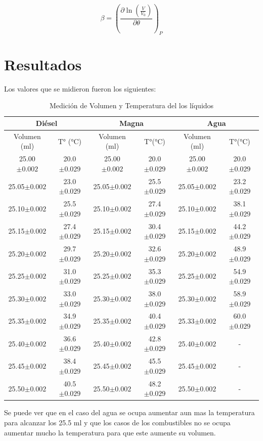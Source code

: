 \documentclass[12pt]{article}
\begin{document}
\begin{equation}
\beta = \left( \frac{\partial \ln \left(\frac{V}{V_0} \right)  }{\partial \theta} \right) _{P}
\end{equation}


\section{Resultados}
Los valores que se midieron fueron los siguientes:

\begin{table}[H]
\centering
\begin{tabular}{|c|c||c|c||c|c|}
\hline
\multicolumn{2}{|c||}{Diésel}  & \multicolumn{2}{|c||}{Magna}  & \multicolumn{2}{|c|}{Agua} \\ \hline
Volumen (ml) & T° (°C) & Volumen (ml) & T°(°C) &Volumen (ml) & T°(°C) \\\hline
  25.00 $\pm 0.002$ & 20.0$\pm 0.029$& 25.00 $\pm 0.002$ & 20.0$\pm 0.029$ &25.00 $\pm 0.002$ & 20.0$\pm 0.029$ \\\hline
  25.05$\pm 0.002$ & 23.0$\pm 0.029$ & 25.05$\pm 0.002$& 25.5$\pm 0.029$ & 25.05$\pm 0.002$ & 23.2$\pm 0.029$ \\\hline
  25.10$\pm 0.002$ & 25.5$\pm 0.029$ & 25.10$\pm 0.002$& 27.4$\pm 0.029$ & 25.10$\pm 0.002$ & 38.1$\pm 0.029$ \\\hline
  25.15$\pm 0.002$ & 27.4$\pm 0.029$ & 25.15$\pm 0.002$& 30.4$\pm 0.029$ & 25.15$\pm 0.002$ & 44.2$\pm 0.029$\\\hline
  25.20$\pm 0.002$ & 29.7$\pm 0.029$ & 25.20$\pm 0.002$& 32.6$\pm 0.029$ & 25.20$\pm 0.002$ & 48.9$\pm 0.029$\\\hline
  25.25$\pm 0.002$ & 31.0$\pm 0.029$ & 25.25$\pm 0.002$& 35.3$\pm 0.029$ & 25.25$\pm 0.002$ & 54.9$\pm 0.029$\\\hline
  25.30$\pm 0.002$ & 33.0$\pm 0.029$ & 25.30$\pm 0.002$& 38.0$\pm 0.029$ & 25.30$\pm 0.002$ & 58.9$\pm 0.029$\\\hline
  25.35$\pm 0.002$ & 34.9$\pm 0.029$ & 25.35$\pm 0.002$& 40.4$\pm 0.029$ & 25.33$\pm 0.002$ & 60.0$\pm 0.029$\\\hline
  25.40$\pm 0.002$ & 36.6$\pm 0.029$ & 25.40$\pm 0.002$& 42.8$\pm 0.029$ & 25.40$\pm 0.002$ & - \\\hline
  25.45$\pm 0.002$ & 38.4$\pm 0.029$ & 25.45$\pm 0.002$& 45.5$\pm 0.029$ & 25.45$\pm 0.002$ & -\\\hline
  25.50$\pm 0.002$ & 40.5$\pm 0.029$ & 25.50$\pm 0.002$& 48.2$\pm 0.029$ & 25.50$\pm 0.002$ & -\\\hline
\end{tabular}
\caption{Medición de Volumen y Temperatura del los líquidos}
\end{table}
Se puede ver que en el caso del agua se ocupa aumentar aun mas la temperatura para alcanzar los 25.5 ml y que los casos de los combustibles no se ocupa aumentar mucho la temperatura para que este aumente su volumen.
\pagebreak
\end{document}
